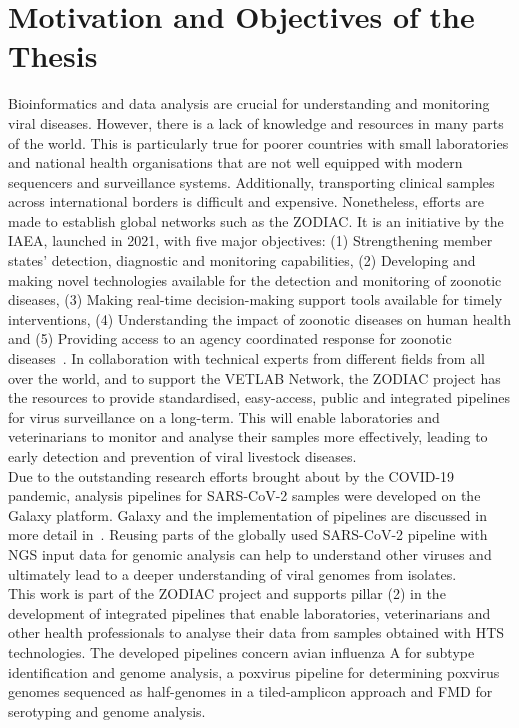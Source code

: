 \section{Motivation and Objectives of the Thesis}
Bioinformatics and data analysis are crucial for understanding and monitoring viral diseases. However, there is a lack of knowledge and resources in many parts of the world. This is particularly true for poorer countries with small laboratories and national health organisations that are not well equipped with modern sequencers and surveillance systems. Additionally, transporting clinical samples across international borders is difficult and expensive. Nonetheless, efforts are made to establish global networks such as the \ac{ZODIAC}. It is an initiative by the \ac{IAEA}, launched in 2021, with five major objectives: (1) Strengthening member states' detection, diagnostic and monitoring capabilities, (2) Developing and making novel technologies available for the detection and monitoring of zoonotic diseases, (3) Making real-time decision-making support tools available for timely interventions, (4) Understanding the impact of zoonotic diseases on human health and (5) Providing access to an agency coordinated response for zoonotic diseases~\cite{zodiac2021}. In collaboration with technical experts from different fields from all over the world, and to support the \ac{VETLAB} Network, the \ac{ZODIAC} project has the resources to provide standardised, easy-access, public and integrated pipelines for virus surveillance on a long-term. This will enable laboratories and veterinarians to monitor and analyse their samples more effectively, leading to early detection and prevention of viral livestock diseases. \\
Due to the outstanding research efforts brought about by the \ac{COVID-19} pandemic, analysis pipelines for \ac{SARS-CoV-2} samples were developed on the Galaxy platform. Galaxy and the implementation of pipelines are discussed in more detail in~. Reusing parts of the globally used \ac{SARS-CoV-2} pipeline with \ac{NGS} input data for genomic analysis can help to understand other viruses and ultimately lead to a deeper understanding of viral genomes from isolates. \\
This work is part of the \ac{ZODIAC} project and supports pillar (2) in the development of integrated pipelines that enable laboratories, veterinarians and other health professionals to analyse their data from samples obtained with \ac{HTS} technologies. The developed pipelines concern avian influenza A for subtype identification and genome analysis, a poxvirus pipeline for determining poxvirus genomes sequenced as half-genomes in a tiled-amplicon approach and \ac{FMD} for serotyping and genome analysis. %

